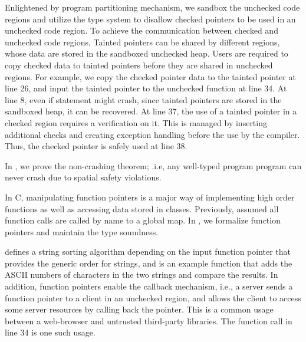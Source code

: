 Enlightened by program partitioning mechanism,
we sandbox the unchecked code regions and utilize the \checkedc type system
to disallow checked pointers to be used in an unchecked code region. 
To achieve the communication between checked and unchecked code regions,
Tainted pointers can be shared by different regions,
whose data are stored in the sandboxed unchecked heap.
Users are required to copy checked data to tainted pointers before they are shared in unchecked regions.
For example,  we copy the checked pointer data to the tainted pointer 
at  line 26,
and input the tainted pointer to the unchecked function at line 34.
At line 8, even if statement might crash, since tainted pointers are stored
in the sandboxed heap, it can be recovered.
At line 37, the use of a tainted pointer in a checked region
requires a verification on it.
This is managed by inserting additional checks
and creating exception handling before the use by the \systemname compiler.
Thus, the checked pointer  is safely used at line 38.

In \systemname, we prove the non-crashing theorem;
.i.e, any well-typed \systemname program program can never crash due to spatial safety violations.

In C, manipulating function pointers is a major way of 
implementing high order functions as well as accessing data stored in classes.
Previously, \checkedc assumed all function calls are called by name to a global map.
In \systemname, we formalize function pointers and maintain the \systemname type soundness.

 defines a string sorting algorithm
depending on the input function pointer  that provides the generic order for strings,
and  is an example  function
that adds the ASCII numbers of characters in the two strings and compare the results.
In addition, function pointers enable the callback mechanism,
i.e., a server sends a function pointer to a client in an unchecked region,
and allows the client to access some server resources by calling back the pointer.
This is a common usage between a web-browser and untrusted third-party libraries.
The function call in  line 34 is one such usage.

